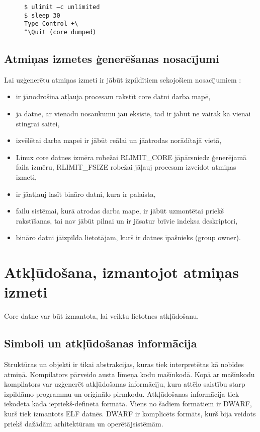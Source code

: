 \begin{figure}[h]
\begin{lstlisting}
$ ulimit –c unlimited
$ sleep 30
Type Control +\
^\Quit (core dumped)
\end{lstlisting}
\caption{\textbf{\fontsize{11}{12}\selectfont {Atmiņas izmetes ģenerēšana, izmantojot īsinājumtaustiņus}}}
\end{figure}

\subsection{Atmiņas izmetes ģenerēšanas nosacījumi}
Lai  uzģenerētu atmiņas izmeti ir jābūt izpildītiem sekojošiem nosacījumiem \cite {nosacijumi}:
\begin{itemize}
	\item   ir jānodrošina atļauja procesam rakstīt core datni darba mapē,
	\item 	ja datne, ar vienādu nosaukumu jau eksistē, tad ir jābūt ne vairāk kā vienai stingrai saitei, 
	\item 	izvēlētai darba mapei ir jābūt reālai un jāatrodas norādītajā vietā, 
	\item 	Linux core datnes izmēra robežai {RLIMIT\_CORE} jāpārsniedz ģenerējamā faila izmēru, { RLIMIT\_FSIZE} robežai jāļauj procesam izveidot atmiņas izmeti,
	\item 	ir  jāatļauj lasīt bināro datni, kura ir palaista,
	\item 	failu sistēmai, kurā atrodas darba mape, ir jābūt uzmontētai priekš rakstīšanas, tai nav jābūt pilnai un ir jāsatur brīvie indeksa deskriptori,
	\item 	bināro datni jāizpilda lietotājam, kurš ir datnes īpašnieks (group owner).
\end{itemize} 



\section{Atkļūdošana, izmantojot atmiņas izmeti}
Core datne var būt izmantota, lai veiktu lietotnes atkļūdošanu. 


\subsection{Simboli un atkļūdošanas informācija}

Struktūras un objekti ir tikai abstrakcijas, kuras tiek interpretētas kā nobīdes atmiņā. Kompilators pārveido austa līmeņa kodu mašīnkodā. 
Kopā ar mašīnkodu kompilators var uzģenerēt atkļūdošanas informāciju, kura attēlo saistību starp izpildāmo programmu un oriģinālo pirmkodu.
Atkļūdošanas informācija tiek iekodēta kāda iepriekš-definētā formātā. Viens no šādiem formātiem ir DWARF, kurš tiek izmantots ELF datnēs.
DWARF ir komplicēts formāts, kurš bija veidots priekš dažādām arhitektūram un operētājsistēmām.

